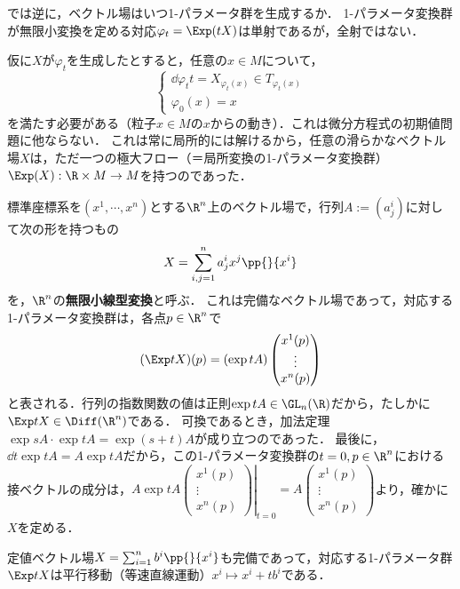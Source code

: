 \documentclass[uplatex,dvipdfmx]{jsreport}
\begin{document}
\begin{problem}
    では逆に，ベクトル場はいつ1-パラメータ群を生成するか．
    1-パラメータ変換群が無限小変換を定める対応$\varphi_t=\Exp(tX)$は単射であるが，全射ではない．
\end{problem}
\begin{discussion}
    仮に$X$が$\varphi_t$を生成したとすると，任意の$x\in M$について，
    \[\begin{cases}
        \dd{\varphi_t}{t}=X_{\varphi_t(x)}\in T_{\varphi_t(x)}\\
        \varphi_0(x)=x
    \end{cases}\]
    を満たす必要がある（粒子$x\in M$の$x$からの動き）．これは微分方程式の初期値問題に他ならない．
    これは常に局所的には解けるから，任意の滑らかなベクトル場$X$は，ただ一つの極大フロー（＝局所変換の1-パラメータ変換群）$\Exp(X):\R\times M\to M$を持つのであった．
\end{discussion}

\begin{example}
    標準座標系を$(x^1,\cdots,x^n)$とする$\R^n$上のベクトル場で，行列$A:=(a^i_j)$に対して次の形を持つもの
    \[X=\sum^n_{i,j=1}a^i_jx^j\pp{}{x^i}\]
    を，$\R^n$の\textbf{無限小線型変換}と呼ぶ．
    これは完備なベクトル場であって，対応する1-パラメータ変換群は，各点$p\in\R^n$で
    \[(\Exp tX)(p)=(\exp tA)\begin{pmatrix}x^1(p)\\\vdots\\x^n(p)\end{pmatrix}\]
    と表される．行列の指数関数の値は正則$\exp tA\in\GL_n(\R)$だから，たしかに$\Exp tX\in\Diff(\R^n)$である．
    可換であるとき，加法定理$\exp sA\cdot\exp tA=\exp(s+t)A$が成り立つのであった．
    最後に，$\dd{}{t}\exp tA=A\exp tA$だから，この1-パラメータ変換群の$t=0,p\in\R^n$における接ベクトルの成分は，$A\exp tA\left.\begin{pmatrix}x^1(p)\\\vdots\\x^n(p)\end{pmatrix}\right|_{t=0}=A\begin{pmatrix}x^1(p)\\\vdots\\x^n(p)\end{pmatrix}$より，確かに$X$を定める．
\end{example}

\begin{example}
    定値ベクトル場$X=\sum^n_{i=1}b^i\pp{}{x^i}$も完備であって，対応する1-パラメータ群$\Exp tX$は平行移動（等速直線運動）$x^i\mapsto x^i+tb^i$である．
\end{example}
\end{document}
